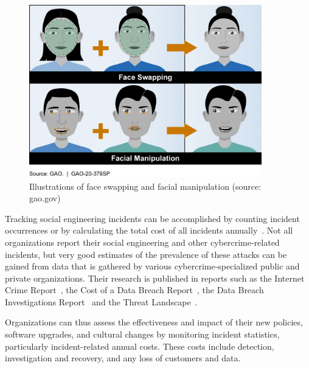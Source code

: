\begin{figure}[h]  
    \centering  
    \includegraphics[width=0.9\textwidth]{images/704754.png}  
    \caption{Illustrations of face swapping and facial manipulation (source: gao.gov)}  
    \label{figure:deepfakes}  
\end{figure}  

%
%
Tracking social engineering incidents can be accomplished by counting incident occurrences or by calculating the total cost of all incidents annually~\citep{ibm_Cost_Data_Breach_Report_2024}. Not all organizations report their social engineering and other cybercrime-related incidents, but very good estimates of the prevalence of these attacks can be gained from data that is gathered by various cybercrime-specialized public and private organizations. Their research is published in reports such as the Internet Crime Report~\citep{fbi_Internet_Crime_Report_2023}, the Cost of a Data Breach Report~\citep{ibm_Cost_Data_Breach_Report_2024}, the Data Breach Investigations Report~\citep{verizon_Data_Breach_Investigations_Report_2024} and the Threat Landscape~\citep{eniza_Threat_Landscape_2024}. 

Organizations can thus assess the effectiveness and impact of their new policies, software upgrades, and cultural changes by monitoring incident statistics, particularly incident-related annual costs. These costs include detection, investigation and recovery, and any loss of customers and data. %






